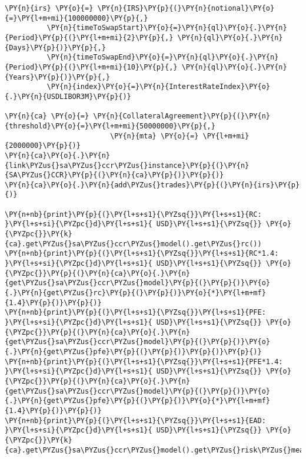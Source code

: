     \begin{tcolorbox}[breakable, size=fbox, boxrule=1pt, pad at break*=1mm,colback=cellbackground, colframe=cellborder]
\begin{Verbatim}[commandchars=\\\{\}]
\PY{n}{irs} \PY{o}{=} \PY{n}{IRS}\PY{p}{(}\PY{n}{notional}\PY{o}{=}\PY{l+m+mi}{100000000}\PY{p}{,}
          \PY{n}{timeToSwapStart}\PY{o}{=}\PY{n}{ql}\PY{o}{.}\PY{n}{Period}\PY{p}{(}\PY{l+m+mi}{2}\PY{p}{,} \PY{n}{ql}\PY{o}{.}\PY{n}{Days}\PY{p}{)}\PY{p}{,}
          \PY{n}{timeToSwapEnd}\PY{o}{=}\PY{n}{ql}\PY{o}{.}\PY{n}{Period}\PY{p}{(}\PY{l+m+mi}{10}\PY{p}{,} \PY{n}{ql}\PY{o}{.}\PY{n}{Years}\PY{p}{)}\PY{p}{,}
          \PY{n}{index}\PY{o}{=}\PY{n}{InterestRateIndex}\PY{o}{.}\PY{n}{USDLIBOR3M}\PY{p}{)}

\PY{n}{ca} \PY{o}{=} \PY{n}{CollateralAgreement}\PY{p}{(}\PY{n}{threshold}\PY{o}{=}\PY{l+m+mi}{50000000}\PY{p}{,}
                         \PY{n}{mta} \PY{o}{=} \PY{l+m+mi}{2000000}\PY{p}{)}
\PY{n}{ca}\PY{o}{.}\PY{n}{link\PYZus{}sa\PYZus{}ccr\PYZus{}instance}\PY{p}{(}\PY{n}{SA\PYZus{}CCR}\PY{p}{(}\PY{n}{ca}\PY{p}{)}\PY{p}{)}
\PY{n}{ca}\PY{o}{.}\PY{n}{add\PYZus{}trades}\PY{p}{(}\PY{n}{irs}\PY{p}{)}

\PY{n+nb}{print}\PY{p}{(}\PY{l+s+s1}{\PYZsq{}}\PY{l+s+s1}{RC:      }\PY{l+s+si}{\PYZpc{}d}\PY{l+s+s1}{ USD}\PY{l+s+s1}{\PYZsq{}} \PY{o}{\PYZpc{}}\PY{k}{ca}.get\PYZus{}sa\PYZus{}ccr\PYZus{}model().get\PYZus{}rc())
\PY{n+nb}{print}\PY{p}{(}\PY{l+s+s1}{\PYZsq{}}\PY{l+s+s1}{RC*1.4:  }\PY{l+s+si}{\PYZpc{}d}\PY{l+s+s1}{ USD}\PY{l+s+s1}{\PYZsq{}} \PY{o}{\PYZpc{}}\PY{p}{(}\PY{n}{ca}\PY{o}{.}\PY{n}{get\PYZus{}sa\PYZus{}ccr\PYZus{}model}\PY{p}{(}\PY{p}{)}\PY{o}{.}\PY{n}{get\PYZus{}rc}\PY{p}{(}\PY{p}{)}\PY{o}{*}\PY{l+m+mf}{1.4}\PY{p}{)}\PY{p}{)}
\PY{n+nb}{print}\PY{p}{(}\PY{l+s+s1}{\PYZsq{}}\PY{l+s+s1}{PFE:     }\PY{l+s+si}{\PYZpc{}d}\PY{l+s+s1}{ USD}\PY{l+s+s1}{\PYZsq{}} \PY{o}{\PYZpc{}}\PY{p}{(}\PY{n}{ca}\PY{o}{.}\PY{n}{get\PYZus{}sa\PYZus{}ccr\PYZus{}model}\PY{p}{(}\PY{p}{)}\PY{o}{.}\PY{n}{get\PYZus{}pfe}\PY{p}{(}\PY{p}{)}\PY{p}{)}\PY{p}{)}
\PY{n+nb}{print}\PY{p}{(}\PY{l+s+s1}{\PYZsq{}}\PY{l+s+s1}{PFE*1.4: }\PY{l+s+si}{\PYZpc{}d}\PY{l+s+s1}{ USD}\PY{l+s+s1}{\PYZsq{}} \PY{o}{\PYZpc{}}\PY{p}{(}\PY{n}{ca}\PY{o}{.}\PY{n}{get\PYZus{}sa\PYZus{}ccr\PYZus{}model}\PY{p}{(}\PY{p}{)}\PY{o}{.}\PY{n}{get\PYZus{}pfe}\PY{p}{(}\PY{p}{)}\PY{o}{*}\PY{l+m+mf}{1.4}\PY{p}{)}\PY{p}{)}
\PY{n+nb}{print}\PY{p}{(}\PY{l+s+s1}{\PYZsq{}}\PY{l+s+s1}{EAD:     }\PY{l+s+si}{\PYZpc{}d}\PY{l+s+s1}{ USD}\PY{l+s+s1}{\PYZsq{}} \PY{o}{\PYZpc{}}\PY{k}{ca}.get\PYZus{}sa\PYZus{}ccr\PYZus{}model().get\PYZus{}risk\PYZus{}measure())
\end{Verbatim}
\end{tcolorbox}


